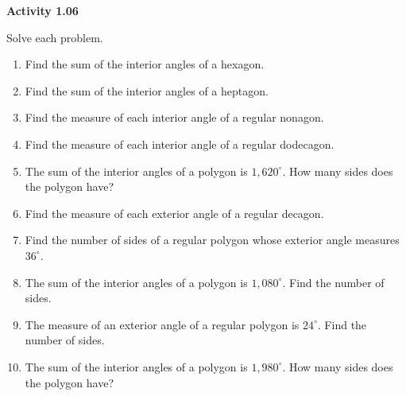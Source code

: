 \vspace{0.3ex}
\noindent\textbf{Activity 1.06}

\vspace{0.2ex}

Solve each problem.
\begin{enumerate}
    \item Find the sum of the interior angles of a hexagon.
    \item Find the sum of the interior angles of a heptagon.
    \item Find the measure of each interior angle of a regular nonagon.
    \item Find the measure of each interior angle of a regular dodecagon.
    \item The sum of the interior angles of a polygon is \( 1,620^\circ \). How many sides does the polygon have?
    \item Find the measure of each exterior angle of a regular decagon.
    \item Find the number of sides of a regular polygon whose exterior angle measures \( 36^\circ \).
    \item The sum of the interior angles of a polygon is \( 1,080^\circ \). Find the number of sides.
    \item The measure of an exterior angle of a regular polygon is \( 24^\circ \). Find the number of sides.
    \item The sum of the interior angles of a polygon is \( 1,980^\circ \). How many sides does the polygon have?
\end{enumerate}
